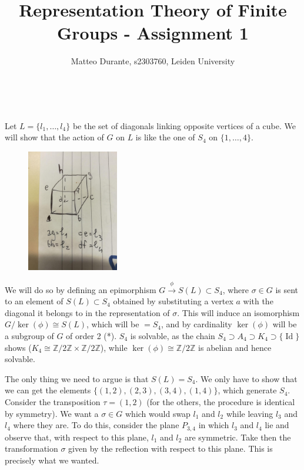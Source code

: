 \documentclass{article}
\newcommand{\numberset}{\mathbb}
\newcommand{\Z}{\numberset{Z}}
\newcommand{\exercise}[1]{\noindent {\bf Exercise #1}}
\DeclareMathOperator{\Id}{Id}
\begin{document}
\title{Representation Theory of Finite Groups - Assignment 1}

\author{Matteo Durante, s2303760, Leiden University}

\maketitle


~\\
\exercise{1.5}

Let $L=\{l_1,\ldots,l_4\}$ be the set of diagonals linking opposite vertices of
a cube. We will show that the action of $G$ on $L$ is like the one of $S_4$ on
$\{1,\ldots,4\}$.
\begin{figure}[h!]
    \centering
    \includegraphics[width=4.0cm]{photo_2019-02-17_23-02-40.jpg}
\end{figure}

We will do so by defining an epimorphism $G\xrightarrow{\phi} S(L)\subset
S_4$, where $\sigma\in G$ is sent to an element of $S(L)\subset S_4$ obtained by
substituting a vertex $a$ with the diagonal it belongs to in the representation
of $\sigma$. This will induce an isomorphism $G/\ker(\phi)\cong S(L)$, which
will be $=S_4$, and by cardinality $\ker(\phi)$ will be a subgroup of $G$ 
of order 2 (*). $S_4$ is solvable, as the chain $S_4\supset A_4\supset K_4
\supset \{\Id\}$ shows ($K_4\cong\Z/2\Z\times\Z/2\Z$), while 
$\ker(\phi)\cong\Z/2\Z$ is abelian and hence solvable.

The only thing we need to argue is that $S(L)=S_4$. We only have
to show that we can get the elements $\{(1,2),(2,3),(3,4),(1,4)\}$, which
generate $S_4$. Consider the
transposition $\tau=(1,2)$ (for the others, the procedure is identical by
symmetry). We want a $\sigma\in G$ which would swap $l_1$ and $l_2$ while
leaving $l_3$ and $l_4$ where they are. To do this, consider the plane $P_{3,4}$ in
which $l_3$ and $l_4$ lie and observe that, with respect to this plane, $l_1$
and $l_2$ are symmetric. Take then the transformation $\sigma$ given by
the reflection with respect to this plane. This is precisely what we wanted.
\end{document}
